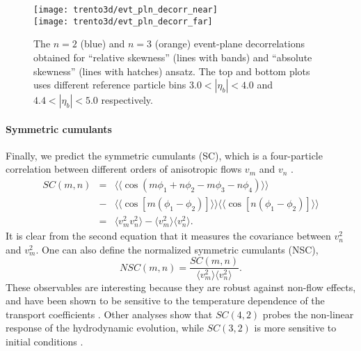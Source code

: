 \begin{figure}
\singlespacing 
\centering
\texttt{[image: trento3d/evt\_pln\_decorr\_near]}\\
\texttt{[image: trento3d/evt\_pln\_decorr\_far]}
\caption[The $n=2$ (blue) and $n=3$ (orange) event-plane decorrelations]{The $n=2$ (blue) and $n=3$ (orange) event-plane decorrelations obtained for ``relative skewness'' (lines with bands) and ``absolute skewness'' (lines with hatches) ansatz. The top and bottom plots uses different reference particle bins $3.0<|\eta_b|<4.0$ and $4.4<|\eta_b|<5.0$ respectively.}
\label{fig:trento:epd}
\end{figure}

\paragraph{Symmetric cumulants} Finally, we predict the symmetric cumulants (SC), which is a four-particle correlation between different orders of anisotropic flows $v_m$ and $v_n$ \cite{Niemi:2012aj,Bilandzic:2013kga}.
\begin{eqnarray}
SC(m, n) &=& \langle\langle \cos(m\phi_1+n\phi_2-m\phi_3-n\phi_4)\rangle\rangle \nonumber \\
\nonumber &-& \langle\langle\cos[m(\phi_1-\phi_2)]\rangle\rangle\langle\langle\cos[n(\phi_1-\phi_2)]\rangle\rangle \label{eq:scmn}\\
&=& \langle v_m^2 v_n^2 \rangle - \langle v_m^2\rangle\langle v_n^2\rangle.
\end{eqnarray}
It is clear from the second equation that it measures the covariance between $v_n^2$ and $v_m^2$.
One can also define the normalized symmetric cumulants (NSC),
\begin{equation}
NSC(m,n) = \frac{SC(m,n)}{\langle v_m^2\rangle\langle v_n^2\rangle}.
\end{equation}
These observables are interesting because they are robust against non-flow effects, and have been shown to be sensitive to the temperature dependence of the transport coefficients \cite{ALICE:2016kpq}.
Other analyses show that $SC(4,2)$ probes the non-linear response of the hydrodynamic evolution, while $SC(3,2)$ is more sensitive to initial conditions \cite{Zhu:2016puf}.

